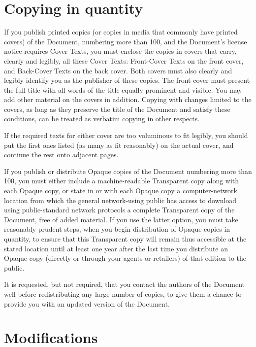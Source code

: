 \section{Copying in quantity}

If you publish printed copies (or copies in media that commonly have
printed covers) of the Document, numbering more than 100, and the
Document's license notice requires Cover Texts, you must enclose the
copies in covers that carry, clearly and legibly, all these Cover
Texts: Front-Cover Texts on the front cover, and Back-Cover Texts on
the back cover.  Both covers must also clearly and legibly identify
you as the publisher of these copies.  The front cover must present
the full title with all words of the title equally prominent and
visible.  You may add other material on the covers in addition.
Copying with changes limited to the covers, as long as they preserve
the title of the Document and satisfy these conditions, can be treated
as verbatim copying in other respects.

If the required texts for either cover are too voluminous to fit
legibly, you should put the first ones listed (as many as fit
reasonably) on the actual cover, and continue the rest onto adjacent
pages.

If you publish or distribute Opaque copies of the Document numbering
more than 100, you must either include a machine-readable Transparent
copy along with each Opaque copy, or state in or with each Opaque copy
a computer-network location from which the general network-using
public has access to download using public-standard network protocols
a complete Transparent copy of the Document, free of added material.
If you use the latter option, you must take reasonably prudent steps,
when you begin distribution of Opaque copies in quantity, to ensure
that this Transparent copy will remain thus accessible at the stated
location until at least one year after the last time you distribute an
Opaque copy (directly or through your agents or retailers) of that
edition to the public.

It is requested, but not required, that you contact the authors of the
Document well before redistributing any large number of copies, to give
them a chance to provide you with an updated version of the Document.


\section{Modifications}

